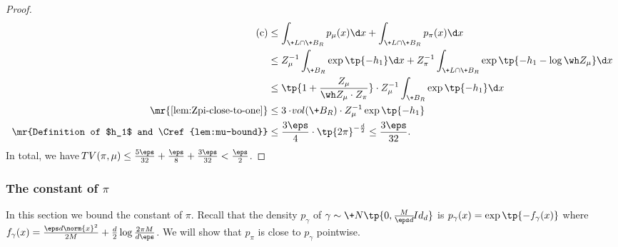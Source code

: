 \begin{proof}
\begin{align*}
        \mbox{(c)}
        &\le \int_{\+L\cap \+B_R} p_\mu(x)\d x + \int_{\+L\cap \+B_R} p_\pi(x) \d x\\
        &\le Z_\mu^{-1}\int_{\+B_R} \exp\tp{-h_1}\d x + Z_\pi^{-1}\int_{\+L\cap \+B_R} \exp\tp{-h_1-\log \wh Z_\mu}\d x\\
        &\le \tp{1+\frac{Z_\mu}{\wh Z_\mu\cdot Z_\pi}}\cdot Z_\mu^{-1}\int_{\+B_R} \exp\tp{-h_1}\d x\\
        \mr{\Cref{lem:Zpi-close-to-one}}
        &\le 3\cdot\!{vol}(\+B_R)\cdot Z_\mu^{-1} \exp\tp{-h_1}\\
        \mr{Definition of $h_1$ and \Cref{lem:mu-bound}}
        &\le\frac{3\eps}{4}\cdot\tp{2\pi}^{-\frac{d}{2}} \le \frac{3\eps}{32}.
    \end{align*}
    In total, we have $\DTV(\pi,\mu) \le \frac{5\eps}{32}+\frac{\eps}{8}+\frac{3\eps}{32}<\frac{\eps}{2}$.
\end{proof}

\subsubsection{The \Poincare constant of $\pi$}\label{sec:ub-poincare}

In this section we bound the \Poincare constant of $\pi$. Recall that the density $p_\gamma$ of $\gamma\sim \+N\tp{0,\frac{M}{\eps d}\!{Id}_d}$ is $p_\gamma(x) = \exp\tp{-f_\gamma(x)}$ where $f_\gamma(x) = \frac{\eps d\norm{x}^2}{2M}+\frac{d}{2}\log\frac{2\pi M}{d\eps}$.  We will show that $p_\pi$ is close to $p_\gamma$ pointwise. 

